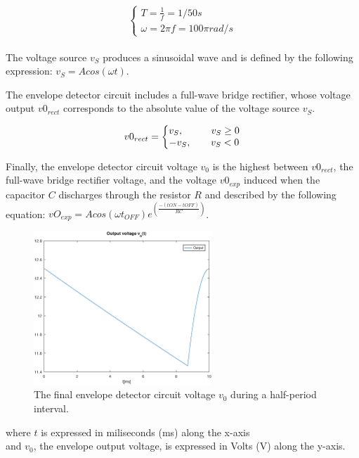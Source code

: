 \[
\left\{\begin{matrix}
T = \frac{1}{f} = 1/50 s\\
\omega = 2 \pi f = 100 \pi rad/s
\end{matrix}\right.
\]

\paragraph{}
The voltage source $v_S$ produces a sinusoidal wave and is defined by the following expression: $v_S=Acos(\omega t)$.

The envelope detector circuit includes a full-wave bridge rectifier, whose voltage output $v0_{rect}$ corresponds to the absolute value of the voltage source $v_S$.

\[
v0_{rect} =
\left\{\begin{matrix}
v_S, \hspace{1cm} v_S \ge 0\\
-v_S,\hspace{0.7cm} v_S < 0\\
\end{matrix}\right.
\]

Finally, the envelope detector circuit voltage $v_0$ is the highest between $v0_{rect}$, the full-wave bridge rectifier voltage, and the voltage $v0_{exp}$ induced when the capacitor $C$ discharges through the resistor $R$ and described by the following equation: $vO_{exp}=Acos(\omega t_{OFF})e^(\frac{-({tON}-{tOFF})}{RC})$.


\begin{figure}[H] \centering
\includegraphics[width=0.6\textwidth]{envelope.eps}
\caption{The final envelope detector circuit voltage $v_0$ during a half-period interval.}
\label{fig:envelope}
\end{figure}

where $t$ is expressed in miliseconds (ms) along the x-axis\\
and $v_0$, the envelope output voltage, is expressed in Volts (V) along the y-axis.

